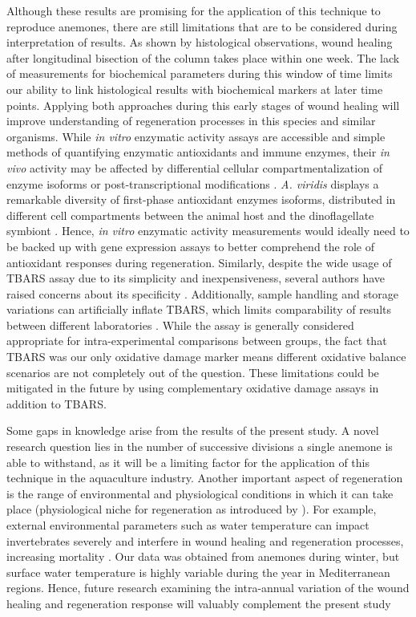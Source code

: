 \documentclass[final,3p,times,authoryear]{elsarticle}
\begin{document}
Although these results are promising for the application of this technique to reproduce anemones, there are still limitations that are to be considered during interpretation of results. As shown by histological observations, wound healing after longitudinal bisection of the column takes place within one week. The lack of measurements for biochemical parameters during this window of time limits our ability to link histological results with biochemical markers at later time points. Applying both approaches during this early stages of wound healing will improve understanding of regeneration processes in this species and similar organisms. While \textit{in vitro} enzymatic activity assays are accessible and simple methods of quantifying enzymatic antioxidants and immune enzymes, their \textit{in vivo} activity may be affected by differential cellular compartmentalization of enzyme isoforms or post-transcriptional modifications \citep{Noctor2016}. \textit{A. viridis} displays a remarkable diversity of first-phase antioxidant enzymes isoforms, distributed in different cell compartments between the animal host and the dinoflagellate symbiont \citep{Richier2003, Merle2007, Pey2017}. Hence, \textit{in vitro} enzymatic activity measurements would ideally need to be backed up with gene expression assays to better comprehend the role of antioxidant responses during regeneration. Similarly, despite the wide usage of TBARS assay due to its simplicity and inexpensiveness, several authors have raised concerns about its specificity \citep{Horak2010, AguilarDiaz2020}. Additionally, sample handling and storage variations can artificially inflate TBARS, which limits comparability of results between different laboratories \citep{AguilarDiaz2020}. While the assay is generally considered appropriate for intra-experimental comparisons between groups, the fact that TBARS was our only oxidative damage marker means different oxidative balance scenarios are not completely out of the question. These limitations could be mitigated in the future by using complementary oxidative damage assays in addition to TBARS.

Some gaps in knowledge arise from the results of the present study. A novel research question lies in the number of successive divisions a single anemone is able to withstand, as it will be a limiting factor for the application of this technique in the aquaculture industry. Another important aspect of regeneration is the range of environmental and physiological conditions in which it can take place (physiological niche for regeneration as introduced by \citet{Mack2025}). For example, external environmental parameters such as water temperature can impact invertebrates severely and interfere in wound healing and regeneration processes, increasing mortality \citep{LaCorte2025}. Our data was obtained from anemones during winter, but surface water temperature is highly variable during the year in Mediterranean regions. Hence, future research examining the intra-annual variation of the wound healing and regeneration response will valuably complement the present study
\end{document}

